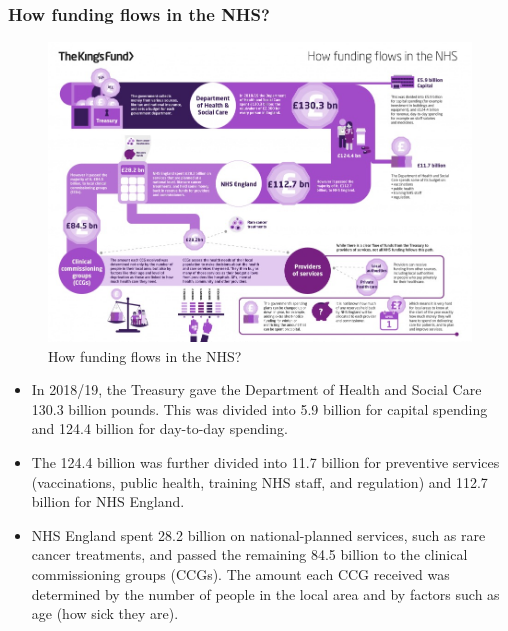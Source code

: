         \subsubsection{How funding flows in the NHS?} 
            \begin{figure}[H]
                \centering
                \includegraphics[width=5in]{images/ch3/11.png}
                \caption{How funding flows in the NHS?}
            \end{figure} 
            \begin{itemize}           
                \item In 2018/19, the Treasury gave the Department of Health and Social Care 130.3 billion pounds. This was divided into 5.9 billion for capital spending and 124.4 billion for day-to-day spending. 
                \item The 124.4 billion was further divided into 11.7 billion for preventive services (vaccinations, public health, training NHS staff, and regulation) and 112.7 billion for NHS England. 
                \item NHS England spent 28.2 billion on national-planned services, such as rare cancer treatments, and passed the remaining 84.5 billion to the clinical commissioning groups (CCGs). The amount each CCG received was determined by the number of people in the local area and by factors such as age (how sick they are).
            \end{itemize} 

